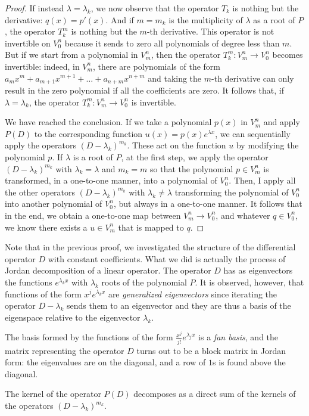 \begin{proof}
If instead $\lambda = \lambda_k$, we now observe that the operator $T_k$ 
is nothing but the derivative: $q(x) = p'(x)$. 
And if $m=m_k$ is the multiplicity of $\lambda$ as a root of $P$, 
the operator $T_k^m$ is nothing but the $m$-th derivative. 
This operator is not invertible on $V^n_0$ because it sends to zero all 
polynomials of degree less than $m$. But if we start from a polynomial in
$V^n_m$,
then the operator $T_k^m\colon V^n_m \to V^n_0$ becomes invertible: 
indeed, in $V^n_m$, there are polynomials of the form 
$a_m x^m + a_{m+1}x^{m+1} + \dots + a_{n+m}x^{n+m}$
and taking the $m$-th derivative can only result in the zero polynomial if all 
the coefficients are zero.
It follows that, if $\lambda = \lambda_k$, 
the operator $T_k^m\colon V^n_m \to V^n_0$ is invertible.

We have reached the conclusion. If we take a polynomial $p(x)$ in $V^n_m$ and
apply $P(D)$
to the corresponding function $u(x) =p(x) e^{\lambda x}$,
we can sequentially apply the operators $(D-\lambda_k)^{m_k}$. 
These act on the function $u$ by modifying the polynomial $p$.
If $\lambda$ is a root of $P$, at the first step, we apply the operator
$(D-\lambda_k)^{m_k}$
with $\lambda_k=\lambda$ and $m_k=m$ so that the polynomial $p\in V^n_m$ is
transformed,
in a one-to-one manner, into a polynomial of $V^n_0$. 
Then, I apply all the other operators $(D-\lambda_k)^{m_k}$ with $\lambda_k \neq
\lambda$
transforming the polynomial of $V^n_0$ into another polynomial of $V^n_0$, but
always in a one-to-one manner.
It follows that in the end, we obtain a one-to-one map between $V^n_m \to
V^n_0$, and whatever
$q\in V^n_0$, we know there exists a $u\in V^n_m$ that is mapped to $q$.
\end{proof}

\begin{remark}
Note that in the previous proof, we investigated the
structure of the differential operator $D$ with constant
coefficients.
What we did is actually the process of
Jordan decomposition of a linear operator.
The operator $D$
has as eigenvectors the functions $e^{\lambda_k x}$ with $\lambda_k$
roots of the polynomial $P$.
It is observed, however, that functions of the form
$x^j e^{\lambda_k x}$ are \emph{generalized eigenvectors}
since iterating the operator $D-\lambda_k$ sends them to an eigenvector
and they are thus a basis of the eigenspace relative to the eigenvector
$\lambda_k$.

The basis formed by the functions of the form $\frac{x^j}{j!} e^{\lambda_j x}$
is
a \emph{fan basis}, and the matrix representing the operator
$D$ turns out to be a block matrix in Jordan form: the
eigenvalues are on the diagonal, and a row of $1$s is found above the
diagonal.

The kernel of the operator $P(D)$ decomposes as a direct sum
of the kernels of the operators $(D-\lambda_k)^{m_k}$.
\end{remark}

